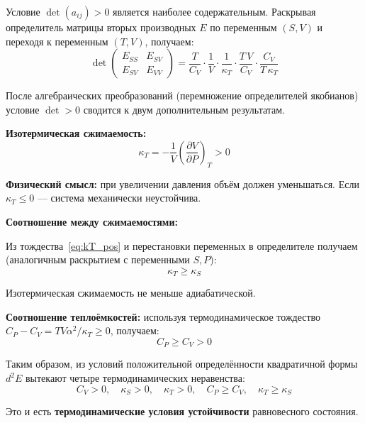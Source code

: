 \documentclass[../general/general]{subfiles}
\begin{document}
Условие $\det(a_{ij}) > 0$ является наиболее содержательным. Раскрывая определитель матрицы вторых производных $E$ по переменным $(S, V)$ и переходя к переменным $(T, V)$, получаем:
\begin{equation}
    \det \begin{pmatrix} E_{SS} & E_{SV} \\ E_{SV} & E_{VV} \end{pmatrix} = \frac{T}{C_V}\cdot\frac{1}{V}\cdot\frac{1}{\kappa_T} \cdot\frac{T\,V}{C_V} \cdot \frac{C_V}{T\,\kappa_T}
\end{equation}

После алгебраических преобразований (перемножение определителей якобианов) условие $\det > 0$ сводится к двум дополнительным результатам.

\medskip
\noindent\textbf{Изотермическая сжимаемость:}
\begin{equation}
    \kappa_T = -\frac{1}{V}\left(\frac{\partial V}{\partial P}\right)_{\!T} > 0
    \label{eq:kT_pos}
\end{equation}

\textbf{Физический смысл:} при увеличении давления объём должен уменьшаться. Если $\kappa_T \leq 0$ --- система механически неустойчива.

\medskip
\noindent\textbf{Соотношение между сжимаемостями:}

Из тождества~\eqref{eq:kT_pos} и перестановки переменных в определителе получаем (аналогичным раскрытием с переменными $S, P$):
\begin{equation}
    \boxed{\kappa_T \geq \kappa_S}
    \label{eq:kT_ge_kS}
\end{equation}

Изотермическая сжимаемость не меньше адиабатической.

\medskip
\noindent\textbf{Соотношение теплоёмкостей:} используя термодинамическое тождество $C_P - C_V = TV\alpha^2/\kappa_T \geq 0$, получаем:
\begin{equation}
    \boxed{C_P \geq C_V > 0}
    \label{eq:CP_ge_CV}
\end{equation}

Таким образом, из условий положительной определённости квадратичной формы $d^2E$ вытекают четыре термодинамических неравенства:
\begin{equation}
    C_V > 0, \quad \kappa_S > 0, \quad \kappa_T > 0, \quad C_P \geq C_V, \quad \kappa_T \geq \kappa_S
\end{equation}

Это и есть \textbf{термодинамические условия устойчивости} равновесного состояния.
\end{document}

